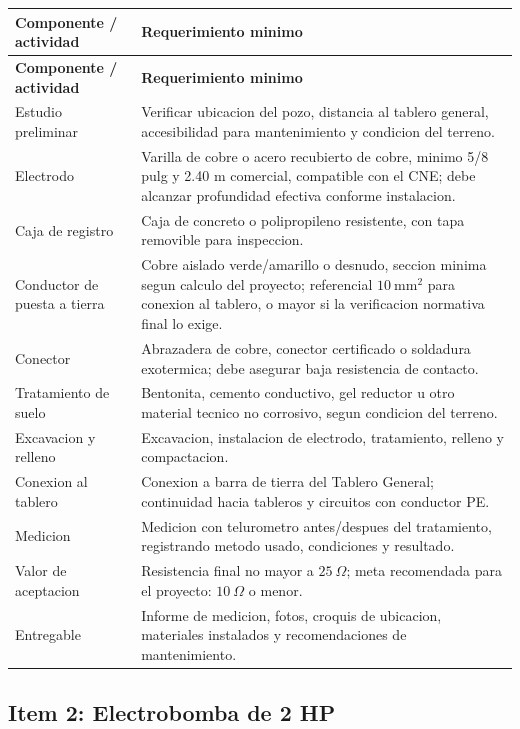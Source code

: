 \documentclass[12pt,letterpaper]{report}
\newcommand{\reqheader}{\rowcolor{modelblue!14}}
\begin{document}
\begin{longtable}{P{0.30\textwidth} P{0.62\textwidth}}
\toprule
\reqheader \textbf{Componente / actividad} & \textbf{Requerimiento minimo} \\
\midrule
\endfirsthead
\toprule
\reqheader \textbf{Componente / actividad} & \textbf{Requerimiento minimo} \\
\midrule
\endhead
Estudio preliminar & Verificar ubicacion del pozo, distancia al tablero general, accesibilidad para mantenimiento y condicion del terreno. \\
Electrodo & Varilla de cobre o acero recubierto de cobre, minimo 5/8 pulg y 2.40 m comercial, compatible con el CNE; debe alcanzar profundidad efectiva conforme instalacion. \\
Caja de registro & Caja de concreto o polipropileno resistente, con tapa removible para inspeccion. \\
Conductor de puesta a tierra & Cobre aislado verde/amarillo o desnudo, seccion minima segun calculo del proyecto; referencial \(10\ \text{mm}^2\) para conexion al tablero, o mayor si la verificacion normativa final lo exige. \\
Conector & Abrazadera de cobre, conector certificado o soldadura exotermica; debe asegurar baja resistencia de contacto. \\
Tratamiento de suelo & Bentonita, cemento conductivo, gel reductor u otro material tecnico no corrosivo, segun condicion del terreno. \\
Excavacion y relleno & Excavacion, instalacion de electrodo, tratamiento, relleno y compactacion. \\
Conexion al tablero & Conexion a barra de tierra del Tablero General; continuidad hacia tableros y circuitos con conductor PE. \\
Medicion & Medicion con telurometro antes/despues del tratamiento, registrando metodo usado, condiciones y resultado. \\
Valor de aceptacion & Resistencia final no mayor a \(25\ \Omega\); meta recomendada para el proyecto: \(10\ \Omega\) o menor. \\
Entregable & Informe de medicion, fotos, croquis de ubicacion, materiales instalados y recomendaciones de mantenimiento. \\
\bottomrule
\end{longtable}

\subsection{Item 2: Electrobomba de 2 HP}
\end{document}
